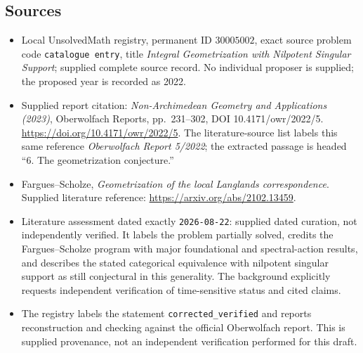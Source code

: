 \documentclass[11pt]{article}
\begin{document}
\subsection{Sources}
\begin{itemize}
\item Local UnsolvedMath registry, permanent ID \(30005002\), exact source problem code \texttt{catalogue entry}, title \emph{Integral Geometrization with Nilpotent Singular Support}; supplied complete source record. No individual proposer is supplied; the proposed year is recorded as 2022.
\item Supplied report citation: \emph{Non-Archimedean Geometry and Applications (2023)}, Oberwolfach Reports, pp.\ 231--302, DOI 10.4171/owr/2022/5. \url{https://doi.org/10.4171/owr/2022/5}. The literature-source list labels this same reference \emph{Oberwolfach Report 5/2022}; the extracted passage is headed ``6. The geometrization conjecture.''
\item Fargues--Scholze, \emph{Geometrization of the local Langlands correspondence}. Supplied literature reference: \url{https://arxiv.org/abs/2102.13459}.
\item Literature assessment dated exactly \texttt{2026-08-22}: supplied dated curation, not independently verified. It labels the problem partially solved, credits the Fargues--Scholze program with major foundational and spectral-action results, and describes the stated categorical equivalence with nilpotent singular support as still conjectural in this generality. The background explicitly requests independent verification of time-sensitive status and cited claims.
\item The registry labels the statement \texttt{corrected\_verified} and reports reconstruction and checking against the official Oberwolfach report. This is supplied provenance, not an independent verification performed for this draft.
\end{itemize}
\end{document}
